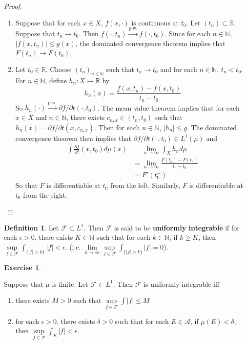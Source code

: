 \documentclass[12pt]{amsart}
\theoremstyle{definition}
\newtheorem{defn}[definition]{Definition}
\newtheorem{ex}[definition]{Exercise}
\newcommand{\del}{\delta}
\newcommand{\ep}{\epsilon}
\newcommand{\N}{\mathbb{N}}
\newcommand{\R}{\mathbb{R}}
\newcommand{\MA}{\mathcal{A}}
\newcommand{\MF}{\mathcal{F}}
\newcommand{\p}{\partial}
\newcommand{\limn}{\lim \limits_{n \rightarrow \infty}}
\newcommand{\convt}[1]{\xrightarrow{\text{#1}}}
\newcommand{\lex}[1]{\label{ex:#1}}
\newcommand{\ld}[1]{\label{defn:#1}}
\begin{document}
	\begin{proof}\
	\begin{enumerate}
	\item Suppose that for each $x \in X$, $f(x, \cdot)$ is continuous at $t_0$. Let $(t_n) \subset \R$. Suppose that $t_n \rightarrow t_0$. Then $f(\cdot , t_n) \convt{p.w.} f(\cdot, t_0)$. Since for each $n \in \N$, $|f(x,t_n)| \leq g(x)$, the dominated convergence theorem implies that $F(t_n) \rightarrow F(t_0)$.
	\item Let $t_0 \in \R$. Choose $(t_n)_{n \in \N}$ such that $ t_n \rightarrow t_0$ and for each $n \in \N$, $t_n < t_0$. For $n \in \N$, define $h_n:X \rightarrow \R$ by $$h_n(x) = \frac{f(x,t_n) - f(x, t_0)}{t_n - t_0}$$ So $h_n(\cdot) \convt{p.w.} \p f / \p t (\cdot, t_0)$. The mean value theorem implies that for each $x \in X$ and $n \in \N$, there exists $c_{n,x} \in (t_n,t_0)$ such that $h_n(x) = \p f / \p t (x, c_{n,x})$. Then for each $n \in \N$, $|h_n| \leq g$. The dominated convergence theorem then implies that $\p f / \p t (\cdot, t_0) \in L^1(\mu)$ and 
	\begin{align*}
	\int \frac{\p f }{\p t} (x, t_0) d\mu(x) 
	&=  \limn \int_X h_n d\mu  \\
	&= \limn \frac{F(t_n) - F(t_0)}{t_n - t_0} \\
	&= F'(t_0^-) 	
	\end{align*}
	So that $F$ is differentiable at $t_0$ from the left. Similarly, $F$ is differentiable at $t_0$ from the right. 
	\end{enumerate}
	\end{proof}
	
	\begin{defn} \ld{00000} 
		Let $\MF \subset L^1$. Then $\MF$ is said to be \textbf{uniformly integrable} if for each $\ep >0$, there exists $K \in \N$ such that for each $k \in \N$, if $k \geq K$, then $\sup\limits_{f \in \MF} \int_{\{|f|>k\}}|f| < \ep$. (i.e. $\lim\limits_{k \rightarrow \infty} \sup\limits_{f \in \MF} \int_{\{|f| > k\}} |f| = 0$).
	\end{defn}
	
	\begin{ex} \lex{00000} 
		
		Suppose that $\mu$ is finite. Let $\MF \subset L^1$. Then $\MF$ is uniformly integrable iff 
		\begin{enumerate}
			\item there exists $M >0$ such that $\sup\limits_{f \in \MF}\int |f| \leq M$
			\item for each $\ep >0$, there exists $\del >0$ such that for each $E \in \MA$, if $\mu(E) < \del$, then $\sup\limits_{f \in \MF} \int_E |f| < \ep$.
		\end{enumerate}
	\end{ex}
	
\end{document}

